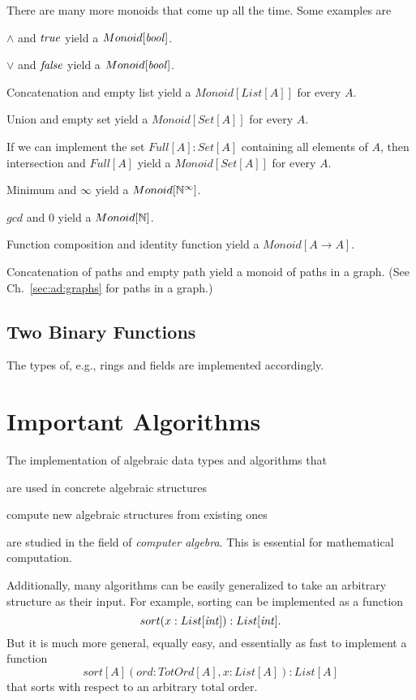 There are many more monoids that come up all the time.
Some examples are
\begin{compactitem}
 \item $\wedge$ and $\mathit{true}$ yield a $Monoid[\mathit{bool}]$.
 \item $\vee$ and $\mathit{false}$ yield a $Monoid[\mathit{bool}]$.
 \item Concatenation and empty list yield a $Monoid[List[A]]$ for every $A$.
 \item Union and empty set yield a $Monoid[Set[A]]$ for every $A$.
 \item If we can implement the set $Full[A]:Set[A]$ containing all elements of $A$, then intersection and $Full[A]$ yield a $Monoid[Set[A]]$ for every $A$.
 \item Minimum and $\infty$ yield a $Monoid[\mathbb{N}^\infty]$.
 \item $gcd$ and $0$ yield a $Monoid[\mathbb{N}]$.
 \item Function composition and identity function yield a $Monoid[A\to A]$.
 \item Concatenation of paths and empty path yield a monoid of paths in a graph. (See Ch.~\ref{sec:ad:graphs} for paths in a graph.)
\end{compactitem}

\subsection{Two Binary Functions}

The types of, e.g., rings and fields are implemented accordingly.

\section{Important Algorithms}

The implementation of algebraic data types and algorithms that
\begin{compactitem}
 \item are used in concrete algebraic structures
 \item compute new algebraic structures from existing ones
\end{compactitem}
are studied in the field of \emph{computer algebra}.
This is essential for mathematical computation.
\medskip

Additionally, many algorithms can be easily generalized to take an arbitrary structure as their input.
For example, sorting can be implemented as a function \[sort(x:List[\mathit{int}]):List[\mathit{int}].\]
But it is much more general, equally easy, and essentially as fast to implement a function \[sort[A](ord: TotOrd[A], x:List[A]):List[A]\] that sorts with respect to an arbitrary total order.

